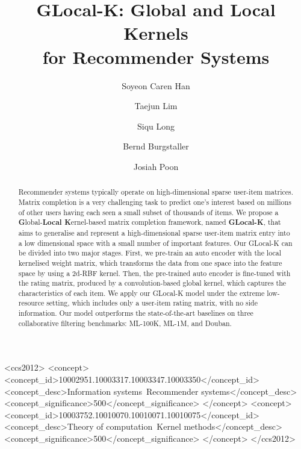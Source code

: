 \documentclass[sigconf]{acmart}
\begin{document}
\fancyhead{}

\title{GLocal-K: Global and Local Kernels \\for Recommender Systems}

\author{Soyeon Caren Han}

\author{Taejun Lim}
\authornotemark[1]

\author{Siqu Long}

\author{Bernd Burgstaller}

\author{Josiah Poon}


\renewcommand{\shortauthors}{Han et.al}

\begin{abstract}
Recommender systems typically operate on high-dimensional sparse user-item matrices. Matrix completion is a very challenging task to predict one's interest based on millions of other users having each seen a small subset of thousands of items. We propose a \textbf{G}lobal-\textbf{Local K}ernel-based matrix completion framework, named \textbf{GLocal-K}, that aims to generalise and represent a high-dimensional sparse user-item matrix entry into a low dimensional space with a small number of important features. Our GLocal-K can be divided into two major stages. First, we pre-train an auto encoder with the local kernelised weight matrix, which transforms the data from one space into the feature space by using a 2d-RBF kernel. Then, the pre-trained auto encoder is fine-tuned with the rating matrix, produced by a convolution-based global kernel, which captures the characteristics of each item. We apply our GLocal-K model under the extreme low-resource setting, which includes only a user-item rating matrix, with no side information. Our model outperforms the state-of-the-art baselines on three collaborative filtering benchmarks: ML-100K, ML-1M, and Douban.
\end{abstract}

\begin{CCSXML}
<ccs2012>
<concept>
<concept_id>10002951.10003317.10003347.10003350</concept_id>
<concept_desc>Information systems~Recommender systems</concept_desc>
<concept_significance>500</concept_significance>
</concept>
<concept>
<concept_id>10003752.10010070.10010071.10010075</concept_id>
<concept_desc>Theory of computation~Kernel methods</concept_desc>
<concept_significance>500</concept_significance>
</concept>
</ccs2012>
\end{CCSXML}
\end{document}
